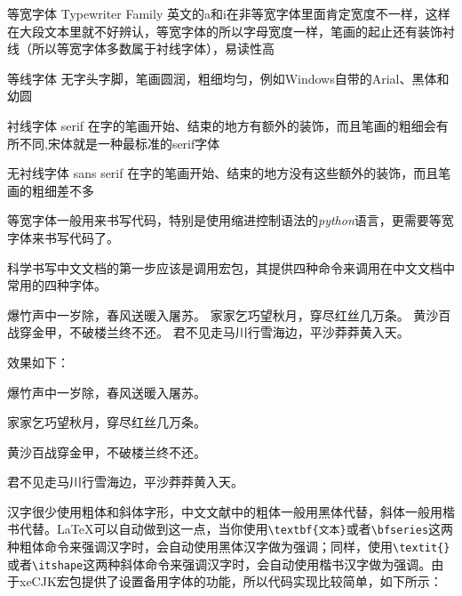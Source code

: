 \begin{asparadesc}
    \item[等宽字体] Typewriter Family 英文的a和i在非等宽字体里面肯定宽度不一样，这样在大段文本里就不好辨认，等宽字体的所以字母宽度一样，笔画的起止还有装饰衬线（所以等宽字体多数属于衬线字体），易读性高
    \item[等线字体] 无字头字脚，笔画圆润，粗细均匀，例如Windows自带的Arial、黑体和幼圆
    \item[衬线字体] serif 在字的笔画开始、结束的地方有额外的装饰，而且笔画的粗细会有所不同,宋体就是一种最标准的serif字体
    \item[无衬线字体] sans serif 在字的笔画开始、结束的地方没有这些额外的装饰，而且笔画的粗细差不多
\end{asparadesc}

等宽字体一般用来书写代码，特别是使用缩进控制语法的\emph{python}语言，更需要等宽字体来书写代码了。

科学书写中文文档的第一步应该是调用\CTeX 宏包，其提供四种命令来调用在中文文档中常用的四种字体。

\begin{latex}
{\songti 爆竹声中一岁除，春风送暖入屠苏。}
{\fangsong 家家乞巧望秋月，穿尽红丝几万条。}
{\heiti 黄沙百战穿金甲，不破楼兰终不还。}
{\kaishu 君不见走马川行雪海边，平沙莽莽黄入天。}
\end{latex}

效果如下：

\begin{center}
    {\songti 爆竹声中一岁除，春风送暖入屠苏。}\par
    {\fangsong 家家乞巧望秋月，穿尽红丝几万条。}\par
    {\heiti 黄沙百战穿金甲，不破楼兰终不还。}\par
    {\kaishu 君不见走马川行雪海边，平沙莽莽黄入天。}
\end{center}

汉字很少使用粗体和斜体字形，中文文献中的粗体一般用黑体代替，斜体一般用楷书代替。\LaTeX 可以自动做到这一点，当你使用\lstinline|\textbf{文本}|或者\lstinline|\bfseries|这两种粗体命令来强调汉字时，会自动使用黑体汉字做为强调；同样，使用\lstinline|\textit{}|或者\lstinline|\itshape|这两种斜体命令来强调汉字时，会自动使用楷书汉字做为强调。由于xeCJK宏包提供了设置备用字体的功能，所以代码实现比较简单，如下所示：

\begin{latex}
\end{latex}

